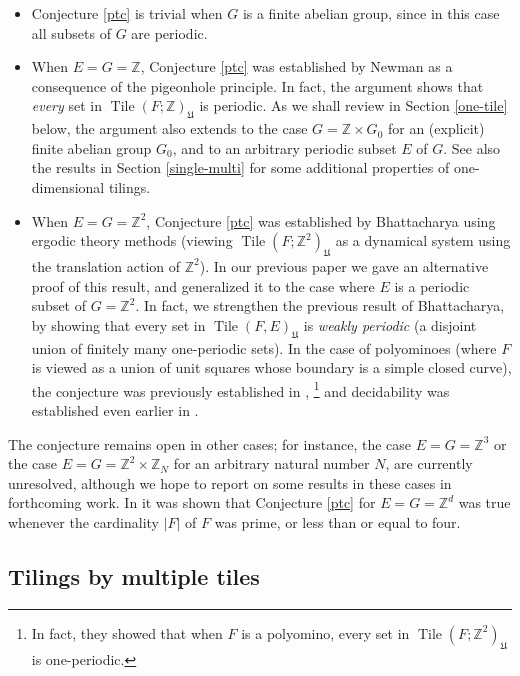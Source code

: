 \documentclass[reqno,a4paper,12pt]{amsart}
\numberwithin{equation}{section}
\numberwithin{figure}{section}
\def\Z{\mathbb{Z}}
\newcommand{\Tile}{\operatorname{Tile}}
\newcommand{\Universe}{{\mathfrak{U}}}
\theoremstyle{plain}
\theoremstyle{definition}
\begin{document}
\begin{itemize}
\item Conjecture \ref{ptc} is trivial when $G$ is a finite abelian group, since in this case all subsets of $G$ are periodic.
\item When $E=G=\Z$, Conjecture \ref{ptc} was established by Newman \cite{N} as a consequence of the pigeonhole principle. In fact, the argument shows that \emph{every} set in $\Tile(F;\Z)_\Universe$ is periodic. As we shall review in Section \ref{one-tile} below, the argument also extends to the case $G = \Z \times G_0$ for an (explicit) finite abelian group $G_0$, and to an arbitrary periodic subset $E$ of $G$. See also the results in Section \ref{single-multi} for some additional properties of one-dimensional tilings.
\item When $E=G=\Z^2$, Conjecture \ref{ptc}  was established by Bhattacharya \cite{BH} using ergodic theory methods (viewing $\Tile(F; \Z^2)_\Universe$ as a dynamical system using the translation action of $\Z^2$).  In our previous paper \cite{GT} we gave an alternative proof of this result, and generalized it to the case where $E$ is a periodic subset of $G = \Z^2$. In fact,  we strengthen the previous result of Bhattacharya, by showing  that every set in $\Tile(F,E)_\Universe$ is \textit{weakly periodic} (a disjoint union of finitely many one-periodic sets).  In the case of polyominoes (where $F$ is viewed as a union of unit squares whose boundary is a simple closed curve), the conjecture was previously established in \cite{bn}, \cite{gbn}\footnote{In fact, they showed that when $F$ is a polyomino, every set in $\Tile(F;\Z^2)_\Universe$ is one-periodic.} and decidability was established even earlier in \cite{wvl}.
\end{itemize}

The conjecture remains open in other cases; for instance, the case $E=G=\Z^3$ or the case $E=G=\Z^2 \times \Z_N$ for an arbitrary natural number $N$, are currently unresolved, although we hope to report on some results in these cases in forthcoming work. In \cite{szegedy} it was shown that Conjecture \ref{ptc} for $E=G=\Z^d$ was true whenever the cardinality $|F|$ of $F$ was prime, or less than or equal to four.

\subsection{Tilings by multiple tiles}
\end{document}
